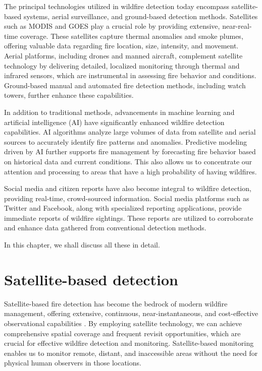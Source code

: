 \documentclass[
  12 pt,
]{Nemilov}
\begin{document}
The principal technologies utilized in wildfire detection today encompass satellite-based systems, aerial surveillance, and ground-based detection methods. Satellites such as MODIS and GOES play a crucial role by providing extensive, near-real-time coverage. These satellites capture thermal anomalies and smoke plumes, offering valuable data regarding fire location, size, intensity, and movement. Aerial platforms, including drones and manned aircraft, complement satellite technology by delivering detailed, localized monitoring through thermal and infrared sensors, which are instrumental in assessing fire behavior and conditions. Ground-based manual and automated fire detection methods, including watch towers, further enhance these capabilities.

In addition to traditional methods, advancements in machine learning and artificial intelligence (AI) have significantly enhanced wildfire detection capabilities. AI algorithms analyze large volumes of data from satellite and aerial sources to accurately identify fire patterns and anomalies. Predictive modeling driven by AI further supports fire management by forecasting fire behavior based on historical data and current conditions. This also allows us to concentrate our attention and processing to areas that have a high probability of having wildfires.

Social media and citizen reports have also become integral to wildfire detection, providing real-time, crowd-sourced information. Social media platforms such as Twitter and Facebook, along with specialized reporting applications, provide immediate reports of wildfire sightings. These reports are utilized to corroborate and enhance data gathered from conventional detection methods.

In this chapter, we shall discuss all these in detail.

\section{Satellite-based detection}\label{satellite-based-detection}

Satellite-based fire detection has become the bedrock of modern wildfire management, offering extensive, continuous, near-instantaneous, and cost-effective observational capabilities \citep{chuvieco2020satellite, wooster2021satellite}. By employing satellite technology, we can achieve comprehensive spatial coverage and frequent revisit opportunities, which are crucial for effective wildfire detection and monitoring. Satellite-based monitoring enables us to monitor remote, distant, and inaccessible areas without the need for physical human observers in those locations.
\end{document}
